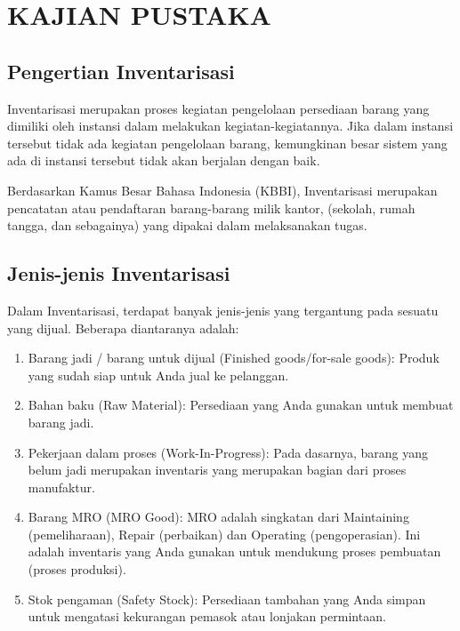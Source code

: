
\chapter{KAJIAN PUSTAKA} 

\section{Pengertian Inventarisasi}

Inventarisasi merupakan proses kegiatan pengelolaan persediaan barang yang dimiliki oleh instansi dalam melakukan kegiatan-kegiatannya. Jika dalam instansi tersebut tidak ada kegiatan pengelolaan barang, kemungkinan besar sistem yang ada di instansi tersebut tidak akan berjalan dengan baik.

Berdasarkan Kamus Besar Bahasa Indonesia (KBBI), Inventarisasi merupakan pencatatan atau pendaftaran barang-barang milik kantor, (sekolah, rumah tangga, dan sebagainya) yang dipakai dalam melaksanakan tugas.

\section{Jenis-jenis Inventarisasi}

Dalam Inventarisasi, terdapat banyak jenis-jenis yang tergantung pada sesuatu yang dijual. Beberapa diantaranya adalah:

\begin{enumerate}
    \item Barang jadi / barang untuk dijual (Finished goods/for-sale goods): Produk yang sudah siap untuk Anda jual ke pelanggan.
    \item Bahan baku (Raw Material): Persediaan yang Anda gunakan untuk membuat barang jadi.
    \item Pekerjaan dalam proses (Work-In-Progress): Pada dasarnya, barang yang belum jadi merupakan inventaris yang merupakan bagian dari proses manufaktur.
    \item Barang MRO (MRO Good): MRO adalah singkatan dari Maintaining (pemeliharaan), Repair (perbaikan) dan Operating (pengoperasian). Ini adalah inventaris yang Anda gunakan untuk mendukung proses pembuatan (proses produksi).
    \item Stok pengaman (Safety Stock): Persediaan tambahan yang Anda simpan untuk mengatasi kekurangan pemasok atau lonjakan permintaan.
\end{enumerate}

